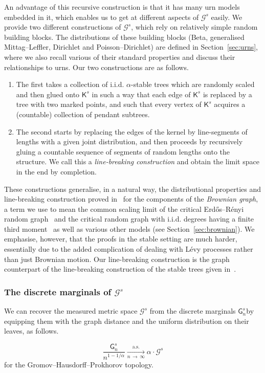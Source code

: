 \documentclass[10pt]{amsart}
\theoremstyle{definition}\newtheorem{defi}[theo]{Definition}\newtheorem{rema}[theo]{Remark}\newtheorem{exam}[theo]{Example}\newtheorem{exem}[theo]{Example}\newtheorem{nota}[theo]{Notation}
\newcommand{\cG}{\mathcal{G}}
\newcommand{\sG}{\mathsf{G}}
\newcommand{\sK}{\mathsf{K}}
\begin{document}
An advantage of this recursive construction is that it has many urn models embedded in it, which enables us to get at different aspects of $\cG^s$ easily. We provide two different constructions of $\cG^s$, which rely on relatively simple random building blocks. The distributions of these building blocks (Beta, generalised Mittag--Leffler, Dirichlet and Poisson--Dirichlet) are defined in Section~\ref{sec:urns}, where we also recall various of their standard properties and discuss their relationships to urns. Our two constructions are as follows.
\begin{enumerate}
\item The first takes a collection of i.i.d. $\alpha$-stable trees which are randomly scaled and then glued onto $\sK^s$ in such a way that each edge of $\sK^s$ is replaced by a tree with two marked points, and such that every vertex of $\sK^s$ acquires a (countable) collection of pendant subtrees.
\item The second starts by replacing the edges of the kernel by line-segments of lengths with a given joint distribution, and then proceeds by recursively gluing a countable sequence of segments of random lengths onto the structure. We call this a \emph{line-breaking construction} and obtain the limit space in the end by completion.
\end{enumerate}

These constructions generalise, in a natural way, the distributional properties and line-breaking construction proved in~\cite{ABBrGo} for the components of the \emph{Brownian graph}, a term we use to mean the common scaling limit of the critical Erd\H{o}s--Rényi random graph~\cite{ABBrGo12} and the critical random graph with i.i.d. degrees having a finite third moment~\cite{BS16+} as well as various other models (see Section~\ref{sec:brownian}). We emphasise, however, that the proofs in the stable setting are much harder, essentially due to the added complication of dealing with Lévy processes rather than just Brownian motion. Our line-breaking construction is the graph counterpart of the line-breaking construction of the stable trees given in~\cite{GHlinebreaking}.

\subsubsection{The discrete marginals of \texorpdfstring{$\cG^s$}{Gs}}\label{sec:marginalsintro}

We can recover the measured metric space $\cG^s$ from the discrete marginals $\sG_{n}^s$\linebreak by equipping them with the graph distance and the uniform distribution on their leaves, as follows.
\begin{prop}\label{prop:approx}
\[
\frac{\sG_n^s}{n^{1-1/\alpha}} \underset{n \,\rightarrow\,\infty}{\overset{\text{a.s.}}\longrightarrow} \alpha \cdot \cG^s
\]
for the Gromov--Hausdorff--Prokhorov topology.
\end{prop}
\end{document}
